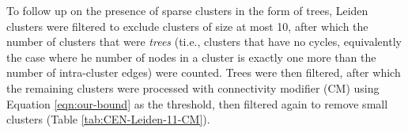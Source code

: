 \documentclass[11pt]{article}   	%
\begin{document}
To follow up on the presence of sparse clusters in the form of trees, Leiden clusters were filtered to exclude clusters of size at most 10, after which the number of clusters that were \emph{trees} (ti.e., clusters that have no cycles, equivalently the case where he number of nodes in a cluster is exactly  one more than the number of intra-cluster edges) were counted. Trees were then filtered, after which the remaining clusters were processed with connectivity modifier (CM) using Equation \ref{eqn:our-bound} as the threshold, then filtered again to remove small clusters (Table \ref{tab:CEN-Leiden-11-CM}).


\clearpage
\end{document}
